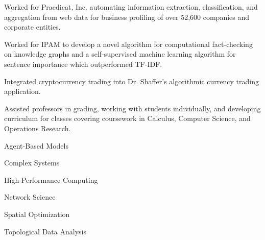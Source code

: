 \documentclass{acmresume}
\begin{document}
        \begin{titemize}
            \item{Worked for Praedicat, Inc. automating information extraction, classification, and aggregation from web data for business profiling of over 52,600 companies and corporate entities.}
            \item{Worked for IPAM to develop a novel algorithm for computational fact-checking on knowledge graphs and a self-supervised machine learning algorithm for sentence importance which outperformed TF-IDF.}
        \end{titemize}

        \begin{titemize}
            \item Integrated cryptocurrency trading into Dr. Shaffer's algorithmic currency trading application.
        \end{titemize}
    
    
    \begin{titemize}
        \item Assisted professors in grading, working with students individually, and developing curriculum for classes covering coursework in Calculus, Computer Science, and Operations Research.
    \end{titemize}


		\begingroup
		\renewcommand{\section}[2]{}
		
		\nocite{*} 
		{}
		\endgroup
        
        \pagebreak
        
        
        \begin{multicols}{3}
            \begin{titemize}
                \item Agent-Based Models
                \item Complex Systems
                \item High-Performance Computing
                \item Network Science
                \item Spatial Optimization
                \item Topological Data Analysis
            \end{titemize}
        \end{multicols}
	
\end{document}
